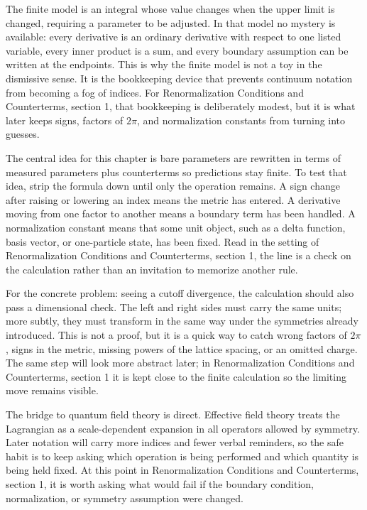 The finite model is an integral whose value changes when the upper limit is changed, requiring a parameter to be adjusted.  In that model no mystery is available: every derivative is an ordinary derivative with respect to one listed variable, every inner product is a sum, and every boundary assumption can be written at the endpoints.  This is why the finite model is not a toy in the dismissive sense.  It is the bookkeeping device that prevents continuum notation from becoming a fog of indices.  For Renormalization Conditions and Counterterms, section 1, that bookkeeping is deliberately modest, but it is what later keeps signs, factors of \(2\pi\), and normalization constants from turning into guesses.

The central idea for this chapter is bare parameters are rewritten in terms of measured parameters plus counterterms so predictions stay finite.  To test that idea, strip the formula down until only the operation remains.  A sign change after raising or lowering an index means the metric has entered.  A derivative moving from one factor to another means a boundary term has been handled.  A normalization constant means that some unit object, such as a delta function, basis vector, or one-particle state, has been fixed.  Read in the setting of Renormalization Conditions and Counterterms, section 1, the line is a check on the calculation rather than an invitation to memorize another rule.

For the concrete problem: seeing a cutoff divergence, the calculation should also pass a dimensional check.  The left and right sides must carry the same units; more subtly, they must transform in the same way under the symmetries already introduced.  This is not a proof, but it is a quick way to catch wrong factors of \(2\pi\), signs in the metric, missing powers of the lattice spacing, or an omitted charge.  The same step will look more abstract later; in Renormalization Conditions and Counterterms, section 1 it is kept close to the finite calculation so the limiting move remains visible.

The bridge to quantum field theory is direct.  Effective field theory treats the Lagrangian as a scale-dependent expansion in all operators allowed by symmetry.  Later notation will carry more indices and fewer verbal reminders, so the safe habit is to keep asking which operation is being performed and which quantity is being held fixed.  At this point in Renormalization Conditions and Counterterms, section 1, it is worth asking what would fail if the boundary condition, normalization, or symmetry assumption were changed.

